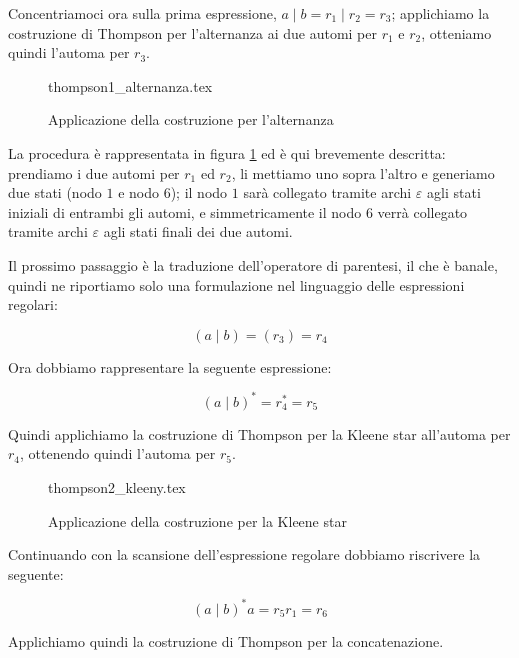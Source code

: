 \documentclass[class=book, crop=false, oneside, 12pt]{standalone}
\begin{document}
Concentriamoci ora sulla prima espressione, \( a \mid b = r_1 \mid r_2 = r_3\); applichiamo la costruzione di Thompson per l’alternanza ai due automi per \(r_1\) e \(r_2\), otteniamo quindi l’automa per \(r_3\).

\begin{figure}
    \centering
    {thompson1_alternanza.tex}
    \caption{Applicazione della costruzione per l'alternanza}
    \label{esempio_Thompson_1}
\end{figure}

La procedura è rappresentata in figura \ref{esempio_Thompson_1} ed è qui brevemente descritta: prendiamo i due automi per \(r_1\) ed \(r_2\), li mettiamo uno sopra l’altro e generiamo due stati (nodo \(1\) e nodo \(6\)); il nodo \(1\) sarà collegato tramite archi \(\varepsilon\) agli stati iniziali di entrambi gli automi, e simmetricamente il nodo \(6\) verrà collegato tramite archi \(\varepsilon\) agli stati finali dei due automi.

Il prossimo passaggio è la traduzione dell'operatore di parentesi, il che è banale, quindi ne riportiamo solo una formulazione nel linguaggio delle espressioni regolari:

\begin{equation*}
    (a \mid b)=(r_3)=r_4
\end{equation*}

\noindent Ora dobbiamo rappresentare la seguente espressione:

\begin{equation*}
    (a\mid b)^\ast = r_4^\ast = r_5
\end{equation*}

\noindent Quindi applichiamo la costruzione di Thompson per la Kleene star all’automa per \(r_4\), ottenendo quindi l’automa per \(r_5\).

\begin{figure}
    \centering
    {thompson2_kleeny.tex}
    \caption{Applicazione della costruzione per la Kleene star}
    \label{esempio_Thompson_2}
\end{figure}

\noindent Continuando con la scansione dell’espressione regolare dobbiamo riscrivere la seguente:

\begin{equation}
    (a \mid b)^\ast a = r_5 r_1 = r_6
\end{equation}

\noindent Applichiamo quindi la costruzione di Thompson per la concatenazione.
\end{document}
